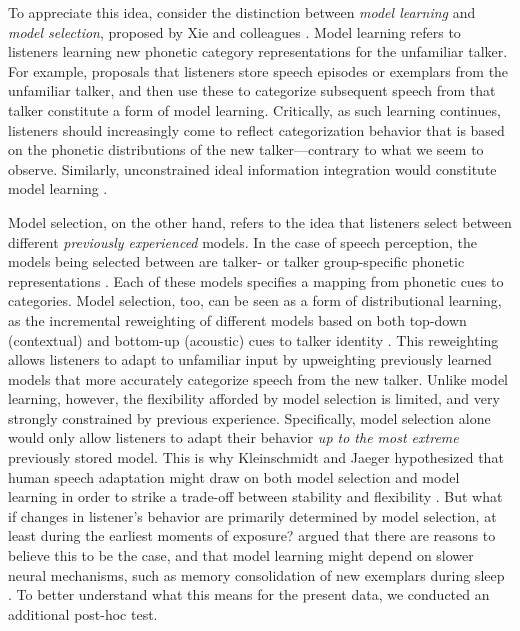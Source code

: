 \documentclass[
  11pt,
  man,mask,floatsintext]{apa6}
\begin{document}
To appreciate this idea, consider the distinction between \emph{model learning} and \emph{model selection}, proposed by Xie and colleagues \autocite*[p.~2028-2029]{xie2018}. Model learning refers to listeners learning new phonetic category representations for the unfamiliar talker. For example, proposals that listeners store speech episodes \autocite{goldinger1998,goldinger2007} or exemplars \autocite{hay2018,johnson1997} from the unfamiliar talker, and then use these to categorize subsequent speech from that talker constitute a form of model learning. Critically, as such learning continues, listeners should increasingly come to reflect categorization behavior that is based on the phonetic distributions of the new talker---contrary to what we seem to observe. Similarly, unconstrained ideal information integration would constitute model learning \autocite[as implemented in the ideal adaptor model,][]{kleinschmidt-jaeger2015}.

Model selection, on the other hand, refers to the idea that listeners select between different \emph{previously experienced} models. In the case of speech perception, the models being selected between are talker- or talker group-specific phonetic representations \autocite[e.g., idiolects, dialects, sociolects, etc., as reviewed in][]{pajak2016}. Each of these models specifies a mapping from phonetic cues to categories. Model selection, too, can be seen as a form of distributional learning, as the incremental reweighting of different models based on both top-down (contextual) and bottom-up (acoustic) cues to talker identity \autocite[p.~180-182]{kleinschmidt2015}. This reweighting allows listeners to adapt to unfamiliar input by upweighting previously learned models that more accurately categorize speech from the new talker. Unlike model learning, however, the flexibility afforded by model selection is limited, and very strongly constrained by previous experience. Specifically, model selection alone would only allow listeners to adapt their behavior \emph{up to the most extreme} previously stored model. This is why Kleinschmidt and Jaeger hypothesized that human speech adaptation might draw on both model selection and model learning in order to strike a trade-off between stability and flexibility \autocite[Equations 24-25, p.~181]{kleinschmidt2015}. But what if changes in listener's behavior are primarily determined by model selection, at least during the earliest moments of exposure? \textcite{xie2018} argued that there are reasons to believe this to be the case, and that model learning might depend on slower neural mechanisms, such as memory consolidation of new exemplars during sleep \autocites[for relevant discussion, see][]{estes1986,fenn2013,xie2018sleep}. To better understand what this means for the present data, we conducted an additional post-hoc test.
\end{document}

